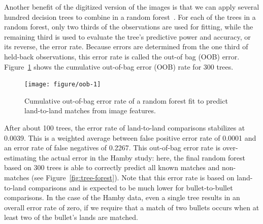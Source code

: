 \documentclass[aoas, preprint]{imsart}\usepackage[]{graphicx}\usepackage[]{color}
\newenvironment{knitrout}{}{} %
\begin{document}
Another benefit of the digitized version of the images is that we can apply several hundred decision trees to combine in a random forest~\citep{breiman:2001, randomForest}.  For each of the trees in a random forest, only two thirds of the observations are used for fitting, while  the remaining third is used to evaluate the tree's predictive power and accuracy, or its reverse, the error rate. Because errors are determined from the one third of held-back observations, this error rate is called the out-of bag (OOB) error. 
Figure~\ref{fig:oob} shows the cumulative out-of-bag error (OOB) rate for 300 trees. 
%
\begin{figure}[hbtp]
  \centering
\begin{knitrout}
\color{fgcolor}
\texttt{[image: figure/oob-1]} 

\end{knitrout}
\caption{\label{fig:oob}Cumulative out-of-bag error rate of a random forest fit to predict land-to-land matches from image features.}
\end{figure}
%
After about 100 trees, the error rate of land-to-land comparisons stabilizes at 0.0039. This is a weighted average between false positive error rate of 0.0001 and an error rate of false negatives of 0.2267. This out-of-bag error rate is over-estimating the actual error in the Hamby study: here, the final random forest based on 300 trees is able to correctly predict all known  matches and non-matches (see Figure~\ref{fig:tree-forest}).
Note that this error rate is based on land-to-land comparisons and is expected to be much lower for bullet-to-bullet comparisons. In the case of the Hamby data, even a single tree results in an overall error rate of zero, if we require that a match of two bullets occurs when at least two of the bullet's lands are matched. %
\end{document}

